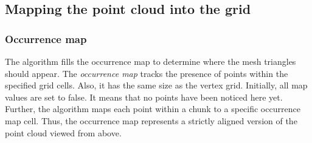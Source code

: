 \subsection{Mapping the point cloud into the grid}

\subsubsection{Occurrence map}

The algorithm fills the occurrence map to determine where the mesh triangles should appear. The \textit{occurrence map} tracks the presence of points within the specified grid cells. Also, it has the same size as the vertex grid. Initially, all map values are set to false. It means that no points have been noticed here yet. Further, the algorithm maps each point within a chunk to a specific occurrence map cell. Thus, the occurrence map represents a strictly aligned version of the point cloud viewed from above.

